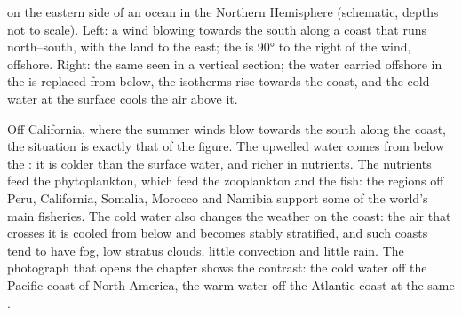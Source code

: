 \begin{omfigure}

{\small {} on the eastern side of an ocean in the Northern
Hemisphere (schematic, depths not to scale). Left: a wind blowing towards the south
along a coast that runs north--south, with the land to the east; the  is \ang{90} to the right of the wind, offshore. Right: the same seen in a
vertical section; the water carried offshore in the  is replaced from
below, the isotherms rise towards the coast, and the cold water at the surface cools
the air above it.}
\label{fig:b1:ocean-circulation:upwelling}
\end{omfigure}

Off California, where the summer winds blow towards the south along the coast,
the situation is exactly that of the figure. The upwelled
water comes from below the : it is colder than the surface water, and
richer in nutrients. The nutrients feed the phytoplankton, which feed the
zooplankton and the fish: the  regions off Peru, California, Somalia,
Morocco and Namibia support some of the world's main fisheries. The cold water also
changes the weather on the coast: the air that crosses it is cooled from below and
becomes stably stratified, and such coasts tend to have fog, low stratus clouds,
little convection and little rain. The photograph that opens the chapter shows the
contrast: the cold water off the Pacific coast of North America, the warm water off
the Atlantic coast at the same .

